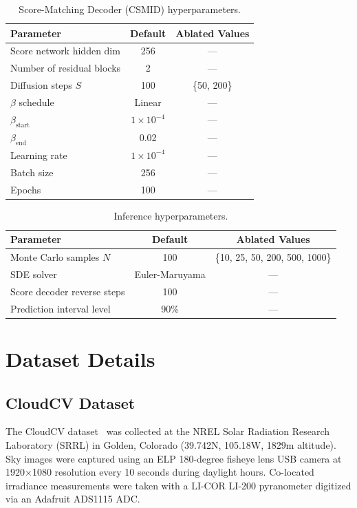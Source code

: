 \documentclass{article}
\begin{document}
\begin{table}[h]
\centering
\caption{Score-Matching Decoder (CSMID) hyperparameters.}
\begin{tabular}{lcc}
\toprule
Parameter & Default & Ablated Values \\
\midrule
Score network hidden dim & 256 & --- \\
Number of residual blocks & 2 & --- \\
Diffusion steps $S$ & 100 & \{50, 200\} \\
$\beta$ schedule & Linear & --- \\
$\beta_{\text{start}}$ & $1 \times 10^{-4}$ & --- \\
$\beta_{\text{end}}$ & 0.02 & --- \\
Learning rate & $1 \times 10^{-4}$ & --- \\
Batch size & 256 & --- \\
Epochs & 100 & --- \\
\bottomrule
\end{tabular}
\end{table}

\begin{table}[h]
\centering
\caption{Inference hyperparameters.}
\begin{tabular}{lcc}
\toprule
Parameter & Default & Ablated Values \\
\midrule
Monte Carlo samples $N$ & 100 & \{10, 25, 50, 200, 500, 1000\} \\
SDE solver & Euler-Maruyama & --- \\
Score decoder reverse steps & 100 & --- \\
Prediction interval level & 90\% & --- \\
\bottomrule
\end{tabular}
\end{table}

\section{Dataset Details}
\label{app:data}

\subsection{CloudCV Dataset}

The CloudCV dataset~\citep{perrsauer2024cloudcv} was collected at the NREL Solar Radiation Research Laboratory (SRRL) in Golden, Colorado (39.742\textdegree N, 105.18\textdegree W, 1829m altitude). Sky images were captured using an ELP 180-degree fisheye lens USB camera at 1920$\times$1080 resolution every 10 seconds during daylight hours. Co-located irradiance measurements were taken with a LI-COR LI-200 pyranometer digitized via an Adafruit ADS1115 ADC.
\end{document}
